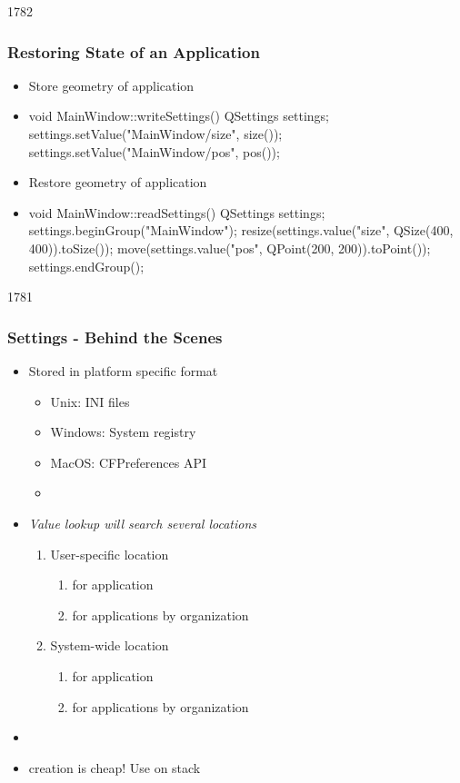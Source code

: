 \begin{slide}[fragile]{1782}\frametitle{Restoring State of an Application}
  \begin{itemize}
  \item Store geometry of application
 \item[] \begin{cpp}
void MainWindow::writeSettings() {
  QSettings settings;
  settings.setValue("MainWindow/size", size());
  settings.setValue("MainWindow/pos", pos());
}    
  \end{cpp}
  \item Restore geometry of application
  \item[] \begin{cpp}
void MainWindow::readSettings() {
  QSettings settings;
  settings.beginGroup("MainWindow");
  resize(settings.value("size", QSize(400, 400)).toSize());
  move(settings.value("pos", QPoint(200, 200)).toPoint());
  settings.endGroup();
}    
  \end{cpp}
  \end{itemize}
\end{slide}


\begin{slide}{1781}\frametitle{Settings - Behind the Scenes}
\begin{itemize}
\item Stored in platform specific format
  \begin{itemize}
  \item Unix: INI files
  \item Windows: System registry
  \item MacOS: CFPreferences API
  \item {}
  \end{itemize}
\end{itemize}
\begin{itemize}
\item \textit{Value lookup will search several locations}
  \begin{enumerate}
  \item  User-specific location
    \begin{enumerate}
    \item  for application
    \item for applications by organization
    \end{enumerate}
  \item  System-wide location
    \begin{enumerate}
    \item  for application
    \item for applications by organization
    \end{enumerate}
  \end{enumerate}
\item {}
\item {} creation is cheap! Use on stack
\end{itemize}
\end{slide}

